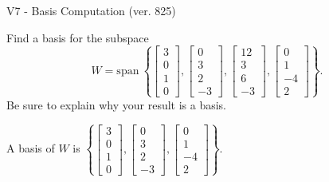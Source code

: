 \begin{exercise}
  \begin{exerciseTitle}V7 - Basis Computation (ver. 825)\end{exerciseTitle}
  \begin{exerciseStatement}
    Find a basis for the subspace 
\[W=\mathrm{span}\ \left\{\left[\begin{array}{r}
3 \\
0 \\
1 \\
0
\end{array}\right] , \left[\begin{array}{r}
0 \\
3 \\
2 \\
-3
\end{array}\right] , \left[\begin{array}{r}
12 \\
3 \\
6 \\
-3
\end{array}\right] , \left[\begin{array}{r}
0 \\
1 \\
-4 \\
2
\end{array}\right]\right\}.\]
 Be sure to explain why your result is a basis.


  \end{exerciseStatement}
  \begin{exerciseAnswer}
   A basis of \(W\) is  \(\left\{\left[\begin{array}{r}
3 \\
0 \\
1 \\
0
\end{array}\right] , \left[\begin{array}{r}
0 \\
3 \\
2 \\
-3
\end{array}\right] , \left[\begin{array}{r}
0 \\
1 \\
-4 \\
2
\end{array}\right]\right\}\).
  


  \end{exerciseAnswer}
\end{exercise}